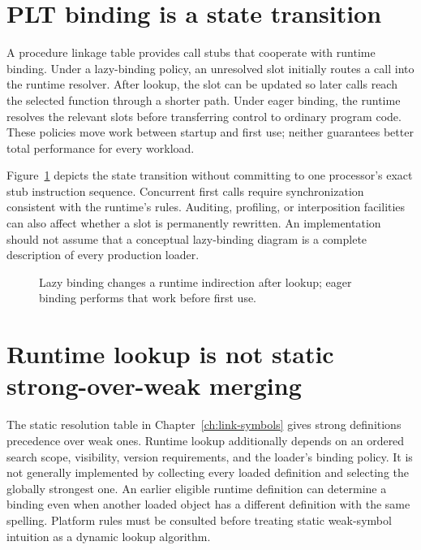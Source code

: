 \section{PLT binding is a state transition}
\label{sec:ch59-plt}

A procedure linkage table provides call stubs that cooperate with runtime binding.
Under a lazy-binding policy, an unresolved slot initially routes a call into the runtime resolver.
After lookup, the slot can be updated so later calls reach the selected function through a shorter path.
Under eager binding, the runtime resolves the relevant slots before transferring control to ordinary program code.
These policies move work between startup and first use; neither guarantees better total performance for every workload.

Figure~\ref{fig:ch59-lazy} depicts the state transition without committing to one processor's exact stub instruction sequence.
Concurrent first calls require synchronization consistent with the runtime's rules.
Auditing, profiling, or interposition facilities can also affect whether a slot is permanently rewritten.
An implementation should not assume that a conceptual lazy-binding diagram is a complete description of every production loader.

\begin{figure}[htbp]
\centering
{}
\caption{Lazy binding changes a runtime indirection after lookup; eager binding performs that work before first use.}
\label{fig:ch59-lazy}
\end{figure}

\section{Runtime lookup is not static strong-over-weak merging}
\label{sec:ch59-lookup}

The static resolution table in Chapter~\ref{ch:link-symbols} gives strong definitions precedence over weak ones.
Runtime lookup additionally depends on an ordered search scope, visibility, version requirements, and the loader's binding policy.
It is not generally implemented by collecting every loaded definition and selecting the globally strongest one.
An earlier eligible runtime definition can determine a binding even when another loaded object has a different definition with the same spelling.
Platform rules must be consulted before treating static weak-symbol intuition as a dynamic lookup algorithm.

